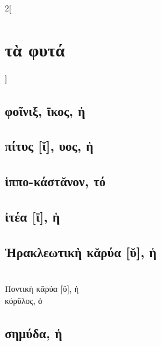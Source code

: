 \documentclass{book}
\begin{document}
\begin{multicols}{2}[\section{τὰ φυτά}]
\subsection{φοῖνιξ, ῑκος, ἡ}
\subsection{πίτυς [ῐ], υος, ἡ}
\subsection{ἱππο-κάστᾰνον, τό}
\subsection{ἰτέα [ῑ], ἡ}
\subsection{Ἡρακλεωτικὴ κᾰρύα [ῠ], ἡ}
  ~\\
Ποντικὴ κᾰρύα [ῠ], ἡ
  ~\\
κόρῠλος, ὁ
\subsection{σημύδα, ἡ}
~
\end{multicols}
\newpage  
\end{document}
